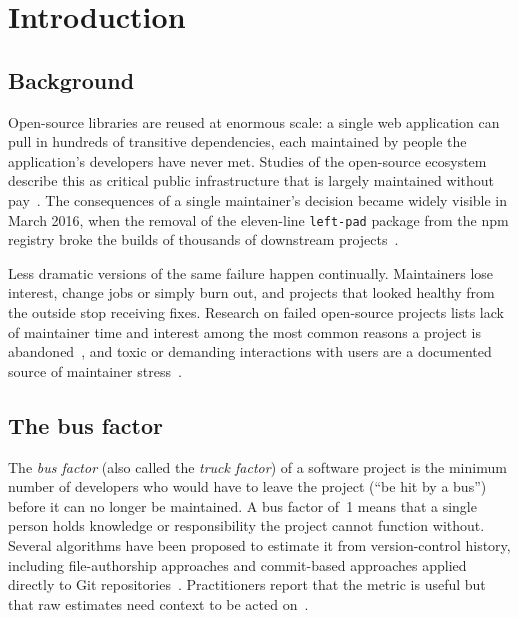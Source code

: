 \documentclass[11pt,a4paper]{report}
\begin{document}
\tableofcontents
\listoffigures
\listoftables

\chapter{Introduction}

\section{Background}

Open-source libraries are reused at enormous scale: a single web application
can pull in hundreds of transitive dependencies, each maintained by people the
application's developers have never met. Studies of the open-source ecosystem
describe this as critical public infrastructure that is largely maintained
without pay~\cite{eghbal2016roads,eghbal2020working}. The consequences of a
single maintainer's decision became widely visible in March 2016, when the
removal of the eleven-line \texttt{left-pad} package from the npm registry
broke the builds of thousands of downstream projects~\cite{npm2016leftpad}.

Less dramatic versions of the same failure happen continually. Maintainers
lose interest, change jobs or simply burn out, and projects that looked healthy
from the outside stop receiving fixes. Research on failed open-source projects
lists lack of maintainer time and interest among the most common reasons a
project is abandoned~\cite{coelho2017fail}, and toxic or demanding interactions
with users are a documented source of maintainer stress~\cite{raman2020stress}.

\section{The bus factor}

The \emph{bus factor} (also called the \emph{truck factor}) of a software
project is the minimum number of developers who would have to leave the project
(``be hit by a bus'') before it can no longer be maintained. A bus factor of~1
means that a single person holds knowledge or responsibility the project cannot
function without. Several algorithms have been proposed to estimate it from
version-control history, including file-authorship approaches
\cite{avelino2016truck} and commit-based approaches applied directly to Git
repositories~\cite{cosentino2015bus}. Practitioners report that the metric is
useful but that raw estimates need context to be acted on~\cite{jabrayilzade2022bus}.
\end{document}
